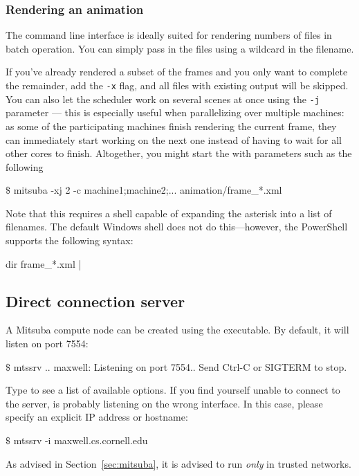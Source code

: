 \subsubsection{Rendering an animation}
The command line interface is ideally suited for rendering numbers of files in batch
operation. You can simply pass in the files using a wildcard in the filename.

If you've already rendered a subset of the frames and you only want to complete the remainder,
add the \texttt{-x} flag, and all files with existing output will be skipped. You can also
let the scheduler work on several scenes at once using the \texttt{-j} parameter --- this is
especially useful when parallelizing over multiple machines: as some of the participating machines
finish rendering the current frame, they can immediately start working on the next one
instead of having to wait for all other cores to finish. Altogether, you
might start the with parameters such as the following
\begin{shell}
$\texttt{\$}$ mitsuba -xj 2 -c machine1;machine2;...  animation/frame_*.xml
\end{shell}
Note that this requires a shell capable of expanding the asterisk into a list of
filenames. The default Windows shell  does not do this---however,
the PowerShell supports the following syntax:
\begin{shell}
dir frame_*.xml | %
\end{shell}

\subsection{Direct connection server}
\label{sec:mtssrv}
A Mitsuba compute node can be created using the  executable. By default,
it will listen on port 7554:
\begin{shell}
$\texttt{\$}$ mtssrv
..
maxwell: Listening on port 7554.. Send Ctrl-C or SIGTERM to stop.
\end{shell}
Type  to see a list of available options.
If you find yourself unable to connect to the server,  is probably listening on
the wrong interface. In this case, please specify an explicit IP address or hostname:
\begin{shell}
$\texttt{\$}$ mtssrv -i maxwell.cs.cornell.edu
\end{shell}
As advised in Section~\ref{sec:mitsuba}, it is advised to run  \emph{only} in trusted networks.

